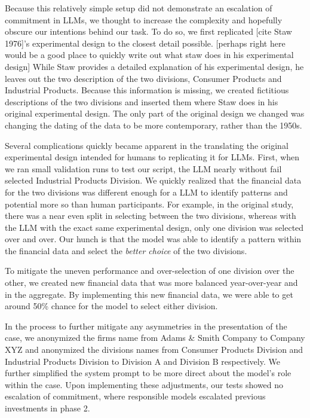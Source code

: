 \documentclass{article}
\begin{document}
Because this relatively simple setup did not demonstrate an escalation of commitment in LLMs, we thought to increase the complexity and hopefully obscure our intentions behind our task. To do so, we first replicated [cite Staw 1976]'s experimental design to the closest detail possible. [perhaps right here would be a good place to quickly write out what staw does in his experimental design] While Staw provides a detailed explanation of his experimental design, he leaves out the two description of the two divisions, Consumer Products and Industrial Products. Because this information is missing, we created fictitious descriptions of the two divisions and inserted them where Staw does in his original experimental design. The only part of the original design we changed was changing the dating of the data to be more contemporary, rather than the 1950s. 

Several complications quickly became apparent in the translating the original experimental design intended for humans to replicating it for LLMs. First, when we ran small validation runs to test our script, the LLM nearly without fail selected Industrial Products Division. We quickly realized that the financial data for the two divisions was different enough for a LLM to identify patterns and potential more so than human participants. For example, in the original study, there was a near even split in selecting between the two divisions, whereas with the LLM with the exact same experimental design, only one division was selected over and over. Our hunch is that the model was able to identify a pattern within the financial data and select the \textit{better choice} of the two divisions. 

To mitigate the uneven performance and over-selection of one division over the other, we created new financial data that was more balanced year-over-year and in the aggregate. By implementing this new financial data, we were able to get around 50\% chance for the model to select either division.

In the process to further mitigate any asymmetries in the presentation of the case, we anonymized the firms name from Adams \& Smith Company to Company XYZ and anonymized the divisions names from Consumer Products Division and Industrial Products Division to Division A and Division B respectively. We further simplified the system prompt to be more direct about the model's role within the case. Upon implementing these adjustments, our tests showed no escalation of commitment, where responsible models escalated previous investments in phase 2. 
\end{document}
